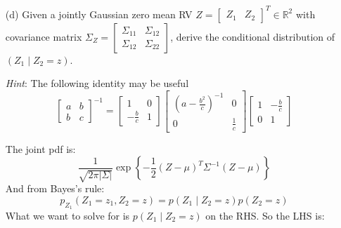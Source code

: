 \documentclass{article}
\begin{document}
\begin{itemize}
        \item [(d)] Given a jointly Gaussian zero mean RV $Z = \begin{bmatrix}
            Z_{1} & Z_{2}   
        \end{bmatrix}^{T} \in \mathbb{R}^{2}$ with covariance matrix $\Sigma_{Z} = \begin{bmatrix}
            \Sigma_{11} & \Sigma_{12} \\
            \Sigma_{12} & \Sigma_{22}   
        \end{bmatrix}$, derive the conditional distribution of $(Z_{1} \mid Z_{2} = z)$.

        \textit{Hint}: The following identity may be useful
            \begin{equation*}
                \begin{bmatrix}
                    a & b \\
                    b & c   
                \end{bmatrix}^{-1} = \begin{bmatrix}
                    1             & 0 \\
                    -\frac{b}{c} & 1   
                \end{bmatrix} \begin{bmatrix}
                    \left(a - \frac{b^{2}}{c}\right)^{-1} & 0            \\
                    0                                      & \frac{1}{c}   
                \end{bmatrix} \begin{bmatrix}
                    1 & -\frac{b}{c} \\
                    0 & 1               
                \end{bmatrix}
            \end{equation*}
            \begin{answer}
                The joint pdf is:
                    \begin{equation*}
                        \dfrac{1}{\sqrt{2\pi\lvert \Sigma \rvert}} \exp\left\{-\dfrac{1}{2}(Z - \mu)^{T}\Sigma^{-1}(Z - \mu)\right\}
                    \end{equation*}
                And from Bayes's rule:
                    \begin{equation*}
                        p_{Z_{1}}(Z_{1} = z_{1}, Z_{2} = z) = p(Z_{1} \mid Z_{2} = z) p(Z_{2} = z)
                    \end{equation*}
                What we want to solve for is $p(Z_{1} \mid Z_{2} = z)$ on the RHS. So the LHS is:

\end{answer}
\end{itemize}
\end{document}
